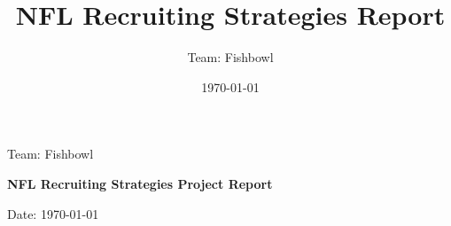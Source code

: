 \documentclass[10pt,letterpaper]{article}
\title{NFL Recruiting Strategies Report}
\author{Team: Fishbowl}
\date{\today}
\begin{document}

\begin{titlepage}
    \centering
    {\Large Team: Fishbowl\par}
    \vspace{0.75cm}
    {\LARGE \textbf{NFL Recruiting Strategies Project Report}\par}
    \vspace{0.75cm}
    {\large Date: \today\par}
    \vfill
\end{titlepage}
\clearpage
{}






















\end{document}
